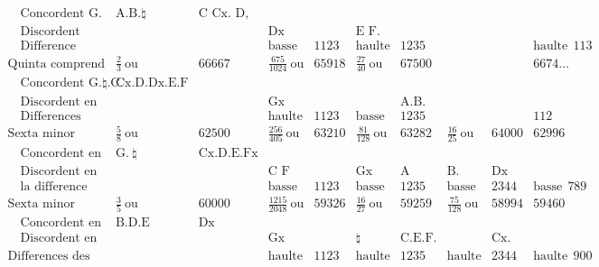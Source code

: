 \documentclass[11pt,a4paper]{article}
\begin{document}
\[\begin{array}{l|ll|ll|ll|ll|l}
\quad\text{Concordent G. Gx.} & \text{A.B.}\natural & \text{C Cx. D, Fx.} & & & & & & & \\
\quad\text{Discordent} & & & \text{Dx} & & \text{E F.} & & & & \\
\quad\text{Difference} & & & \text{basse} & 1123 & \text{haulte} & 1235 & & & \text{haulte}\ \ 113 \\
\hline
\text{Quinta comprend les} & \frac{2}{3}\ \text{ou} & 66667 & \frac{675}{1024}\ \text{ou} & 65918 & \frac{27}{40}\ \text{ou} & 67500 & & & 6674… \\
\quad\text{Concordent G.}\natural\text{.C.} & \text{Cx.D.Dx.E.F Fx.} & & & & & & & & \\
\quad\text{Discordent en} & & & \text{Gx} & & & \text{A.B.} & & & \\
\quad\text{Differences} & & & \text{haulte} & 1123 & \text{basse} & 1235 & & & 112 \\
\hline
\text{Sexta minor comprend} & \frac{5}{8}\ \text{ou} & 62500 & \frac{256}{405}\ \text{ou} & 63210 & \frac{81}{128}\ \text{ou} & 63282 & \frac{16}{25}\ \text{ou} & 64000 & 62996 \\
\quad\text{Concordent en} & \text{G.}\ \natural & \text{Cx.D.E.Fx} & & & & & & & \\
\quad\text{Discordent en} & & & \text{C\ \ F} & & \text{Gx} & \text{A} & \text{B.} & \text{Dx} & \\
\quad\text{la difference} & & & \text{basse} & 1123 & \text{basse} & 1235 & \text{basse} & 2344 & \text{basse}\ \ 789 \\
\hline
\text{Sexta minor comprend} & \frac{3}{5}\ \text{ou} & 60000 & \frac{1215}{2048}\ \text{ou} & 59326 & \frac{16}{27}\ \text{ou} & 59259 & \frac{75}{128}\ \text{ou} & 58994 & 59460 \\
\quad\text{Concordent en G. A} & \text{B.D.E} & \text{Dx} & & & & & & & \\
\quad\text{Discordent en} & & & \text{Gx} & & \natural & \text{C.E.F.} & & \text{Cx.\ Fx} & \\
\text{Differences des concordances auec la parfaite} & & & \text{haulte} & 1123 & \text{haulte} & 1235 & \text{haulte} & 2344 & \text{haulte}\ \ 900
\end{array}
\]
\end{document}
